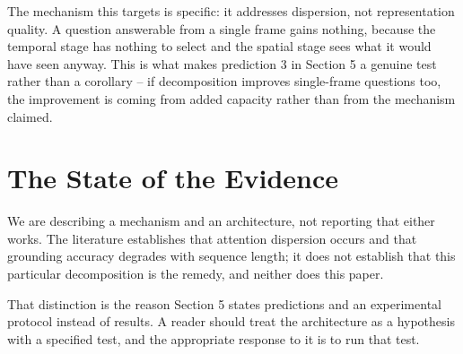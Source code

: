 \documentclass[10pt,journal,compsoc,twocolumn]{IEEEtran}
\begin{document}
The mechanism this targets is specific: it addresses dispersion, not representation quality. A question answerable from a single frame gains nothing, because the temporal stage has nothing to select and the spatial stage sees what it would have seen anyway. This is what makes prediction 3 in Section 5 a genuine test rather than a corollary -- if decomposition improves single-frame questions too, the improvement is coming from added capacity rather than from the mechanism claimed.


\section{The State of the Evidence}


We are describing a mechanism and an architecture, not reporting that either works. The literature establishes that attention dispersion occurs and that grounding accuracy degrades with sequence length; it does not establish that this particular decomposition is the remedy, and neither does this paper.

That distinction is the reason Section 5 states predictions and an experimental protocol instead of results. A reader should treat the architecture as a hypothesis with a specified test, and the appropriate response to it is to run that test.



\par\vspace{0.5em}



\end{document}
